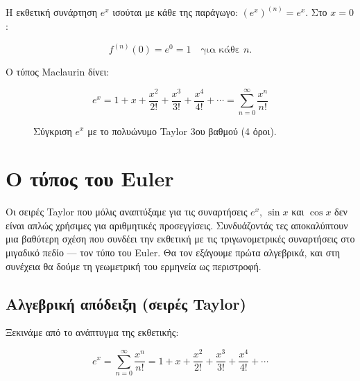 \documentclass[a4paper, 11pt]{article}
\begin{document}
Η εκθετική συνάρτηση \(e^x\) ισούται με κάθε της παράγωγο:
\((e^x)^{(n)} = e^x\). Στο \(x=0\):

\[
f^{(n)}(0) = e^0 = 1 \quad \text{για κάθε } n.
\]

Ο τύπος Maclaurin δίνει:

\[
e^x = 1 + x + \frac{x^2}{2!} + \frac{x^3}{3!} + \frac{x^4}{4!} + \cdots = \sum_{n=0}^{\infty} \frac{x^n}{n!}
\]

\begin{figure}[htbp]
\centering
{}
\caption{Σύγκριση $e^x$ με το πολυώνυμο Taylor 3ου βαθμού (4 όροι).}
\label{fig:exptaylor}
\end{figure}

\section{Ο τύπος του
Euler}\label{ux3bf-ux3c4ux3cdux3c0ux3bfux3c2-ux3c4ux3bfux3c5-euler}

Οι σειρές Taylor που μόλις αναπτύξαμε για τις συναρτήσεις \(e^x\),
\(\sin x\) και \(\cos x\) δεν είναι απλώς χρήσιμες για αριθμητικές
προσεγγίσεις. Συνδυάζοντάς τες αποκαλύπτουν μια βαθύτερη σχέση που
συνδέει την εκθετική με τις τριγωνομετρικές συναρτήσεις στο μιγαδικό
πεδίο --- τον τύπο του Euler. Θα τον εξάγουμε πρώτα αλγεβρικά, και στη
συνέχεια θα δούμε τη γεωμετρική του ερμηνεία ως περιστροφή.

\subsection{Αλγεβρική απόδειξη (σειρές
Taylor)}\label{ux3b1ux3bbux3b3ux3b5ux3b2ux3c1ux3b9ux3baux3ae-ux3b1ux3c0ux3ccux3b4ux3b5ux3b9ux3beux3b7-ux3c3ux3b5ux3b9ux3c1ux3adux3c2-taylor}

Ξεκινάμε από το ανάπτυγμα της εκθετικής:

\[
e^{x} = \sum_{n=0}^{\infty} \frac{x^n}{n!} = 1 + x + \frac{x^2}{2!} + \frac{x^3}{3!} + \frac{x^4}{4!} + \cdots
\]
\end{document}

